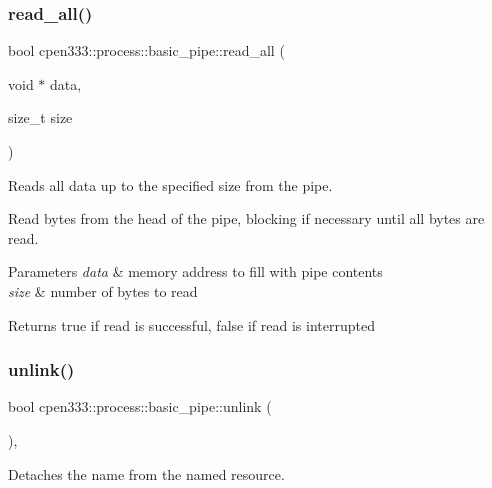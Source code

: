 \subsubsection{\texorpdfstring{read\+\_\+all()}{read\_all()}}
{\footnotesize\ttfamily bool cpen333\+::process\+::basic\+\_\+pipe\+::read\+\_\+all (\begin{DoxyParamCaption}\item[{void $\ast$}]{data,  }\item[{size\+\_\+t}]{size }\end{DoxyParamCaption})\hspace{0.3cm}{\ttfamily [inline]}}



Reads all data up to the specified size from the pipe. 

Read bytes from the head of the pipe, blocking if necessary until all bytes are read.


\begin{DoxyParams}{Parameters}
{\em data} & memory address to fill with pipe contents \\
\hline
{\em size} & number of bytes to read \\
\hline
\end{DoxyParams}
\begin{DoxyReturn}{Returns}
true if read is successful, false if read is interrupted 
\end{DoxyReturn}
\mbox{\label{classcpen333_1_1process_1_1basic__pipe_a344a8291b20be973ade784922bdf37eb}} 
\subsubsection{\texorpdfstring{unlink()}{unlink()}\hspace{0.1cm}{\footnotesize\ttfamily [1/2]}}
{\footnotesize\ttfamily bool cpen333\+::process\+::basic\+\_\+pipe\+::unlink (\begin{DoxyParamCaption}{ }\end{DoxyParamCaption})\hspace{0.3cm}{\ttfamily [inline]}, {\ttfamily [virtual]}}



Detaches the name from the named resource. 

